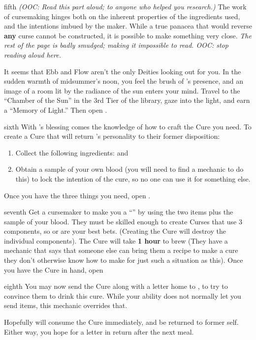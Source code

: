 \documentclass[notebook]{GL2020} %
\begin{document}
\begin{page}{fifth}
\emph{(OOC: Read this part aloud; to anyone who helped you research.)} The work of cursemaking hinges both on the inherent properties of the ingredients used, and the intentions imbued by the maker. While a true panacea that would reverse \textbf{any} curse cannot be constructed, it is possible to make something very close. \emph{The rest of the page is badly smudged; making it impossible to read. OOC: stop reading aloud here.}

It seems that Ebb and Flow aren’t the only Deities looking out for you. In the sudden warmth of midsummer’s noon, you feel the brush of \cFarmGod{}’s presence, and an image of a room lit by the radiance of the sun enters your mind. Travel to the “Chamber of the Sun” in the 3rd Tier of the library, gaze into the light, and earn a “Memory of Light.” Then open .
\end{page}

\begin{page}{sixth}
With \cFarmGod{}’s blessing comes the knowledge of how to craft the Cure you need. To create a Cure that will return \cLoud{}’s personality to their former disposition:
\begin{enumerate}
	\item Collect the following ingredients: \iCharcoal{} and \iSight{}
	\item Obtain a sample of your own blood (you will need to find a mechanic to do this) to lock the intention of the cure, so no one can use it for something else.
\end{enumerate}

Once you have the three things you need, open .
\end{page}

\begin{page}{seventh}
Get a cursemaker to make you a ``\iPanacea{}'' by using the two items plus the sample of your blood. They must be skilled enough to create Curses that use 3 components, so \cPrince{} or \cCurse{} are your best bets. (Creating the Cure will destroy the individual components). The Cure will take \textbf{1 hour} to brew (They have a mechanic that says that someone else can bring them a recipe to make a cure they don’t otherwise know how to make for just such a situation as this). Once you have the Cure in hand, open 
\end{page}

\begin{page}{eighth}
You may now send the Cure along with a letter home to \cLoud{}, to try to convince them to drink this cure. While your ability does not normally let you send items, this mechanic overrides that.

Hopefully \cLoud{} will consume the Cure immediately, and be returned to \cLoud{\their} former self. Either way, you hope for a letter in return after the next meal.

\end{page}

\endnotebook
\end{document}
